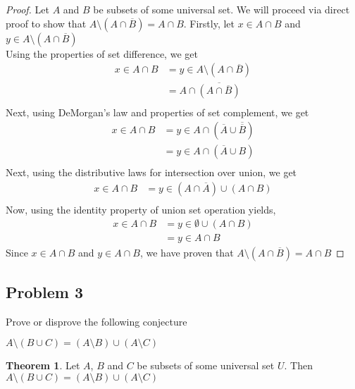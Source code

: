 \documentclass{book}
\theoremstyle{definition}
\newtheorem{theorem}{Theorem}[section]
\begin{document}
\begin{proof}
    Let $A$ and $B$ be subsets of some universal set. We will proceed via direct proof to show that $A \setminus (A \cap \overline{B}) =  A \cap B$. Firstly, let $x \in A \cap B$ and $y \in A \setminus (A \cap \overline{B})$ \\
    
    Using the properties of set difference, we get
        \begin{align*}
            x \in A \cap B & =  y \in A \setminus (A \cap \overline{B}) \\
                & = A \cap \overline{(A \cap \overline{B})} \\
        \end{align*}
    Next, using DeMorgan's law and properties of set complement, we get
        \begin{align*}
             x \in A \cap B & = y \in A \cap (\overline{A} \cup \overline{\overline{B}}) \\
                & = y \in A \cap (\overline{A} \cup B) \\
        \end{align*}    
    Next, using the distributive laws for intersection over union, we get
        \begin{align*}   
            x \in A \cap B & = y \in (A \cap \overline{A}) \cup (A \cap B) \\
        \end{align*}
    Now, using the identity property of union set operation yields,
        \begin{align*}   
            x \in A \cap B & = y \in \emptyset \cup (A \cap B) \\
            & = y \in A \cap B 
        \end{align*}
    Since $x \in A \cap B$ and $y \in A \cap B$, we have proven that $A \setminus (A \cap \overline{B}) =  A \cap B$    
\end{proof}


\newpage
\subsection{Problem 3}
Prove or disprove the  following conjecture
    \begin{center}
        $A \setminus (B \cup C) = (A \setminus B) \cup (A \setminus C)$
    \end{center}

\begin{tcolorbox}
	\begin{theorem}
		Let $A$, $B$ and $C$ be subsets of some universal set $U$. Then $A \setminus (B \cup C) = (A \setminus B) \cup (A \setminus C)$
	\end{theorem}
\end{tcolorbox}
\end{document}
